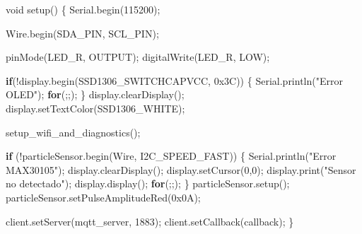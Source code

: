 \documentclass[11pt]{article}
\newenvironment{Shaded}{}{}
\newcommand{\DataTypeTok}[1]{\textcolor[rgb]{0.56,0.13,0.00}{{#1}}}
\newcommand{\DecValTok}[1]{\textcolor[rgb]{0.25,0.63,0.44}{{#1}}}
\newcommand{\BaseNTok}[1]{\textcolor[rgb]{0.25,0.63,0.44}{{#1}}}
\newcommand{\StringTok}[1]{\textcolor[rgb]{0.25,0.44,0.63}{{#1}}}
\newcommand{\NormalTok}[1]{{#1}}
\newcommand{\ControlFlowTok}[1]{\textcolor[rgb]{0.00,0.44,0.13}{\textbf{{#1}}}}
\newcommand{\OperatorTok}[1]{\textcolor[rgb]{0.40,0.40,0.40}{{#1}}}
\begin{document}
\begin{Shaded}
\begin{Highlighting}[]
\DataTypeTok{void}\NormalTok{ setup}\OperatorTok{()} \OperatorTok{\{}
\NormalTok{  Serial}\OperatorTok{.}\NormalTok{begin}\OperatorTok{(}\DecValTok{115200}\OperatorTok{);}

\NormalTok{  Wire}\OperatorTok{.}\NormalTok{begin}\OperatorTok{(}\NormalTok{SDA\_PIN}\OperatorTok{,}\NormalTok{ SCL\_PIN}\OperatorTok{);}

\NormalTok{  pinMode}\OperatorTok{(}\NormalTok{LED\_R}\OperatorTok{,}\NormalTok{ OUTPUT}\OperatorTok{);}
\NormalTok{  digitalWrite}\OperatorTok{(}\NormalTok{LED\_R}\OperatorTok{,}\NormalTok{ LOW}\OperatorTok{);}

  \ControlFlowTok{if}\OperatorTok{(!}\NormalTok{display}\OperatorTok{.}\NormalTok{begin}\OperatorTok{(}\NormalTok{SSD1306\_SWITCHCAPVCC}\OperatorTok{,} \BaseNTok{0x3C}\OperatorTok{))} \OperatorTok{\{}
\NormalTok{    Serial}\OperatorTok{.}\NormalTok{println}\OperatorTok{(}\StringTok{"Error OLED"}\OperatorTok{);}
    \ControlFlowTok{for}\OperatorTok{(;;);}
  \OperatorTok{\}}
\NormalTok{  display}\OperatorTok{.}\NormalTok{clearDisplay}\OperatorTok{();}
\NormalTok{  display}\OperatorTok{.}\NormalTok{setTextColor}\OperatorTok{(}\NormalTok{SSD1306\_WHITE}\OperatorTok{);}

\NormalTok{  setup\_wifi\_and\_diagnostics}\OperatorTok{();}

  \ControlFlowTok{if} \OperatorTok{(!}\NormalTok{particleSensor}\OperatorTok{.}\NormalTok{begin}\OperatorTok{(}\NormalTok{Wire}\OperatorTok{,}\NormalTok{ I2C\_SPEED\_FAST}\OperatorTok{))} \OperatorTok{\{}
\NormalTok{    Serial}\OperatorTok{.}\NormalTok{println}\OperatorTok{(}\StringTok{"Error MAX30105"}\OperatorTok{);}
\NormalTok{    display}\OperatorTok{.}\NormalTok{clearDisplay}\OperatorTok{();}
\NormalTok{    display}\OperatorTok{.}\NormalTok{setCursor}\OperatorTok{(}\DecValTok{0}\OperatorTok{,}\DecValTok{0}\OperatorTok{);}
\NormalTok{    display}\OperatorTok{.}\NormalTok{print}\OperatorTok{(}\StringTok{"Sensor no detectado"}\OperatorTok{);}
\NormalTok{    display}\OperatorTok{.}\NormalTok{display}\OperatorTok{();}
    \ControlFlowTok{for}\OperatorTok{(;;);}
  \OperatorTok{\}}
\NormalTok{  particleSensor}\OperatorTok{.}\NormalTok{setup}\OperatorTok{();}
\NormalTok{  particleSensor}\OperatorTok{.}\NormalTok{setPulseAmplitudeRed}\OperatorTok{(}\BaseNTok{0x0A}\OperatorTok{);}

\NormalTok{  client}\OperatorTok{.}\NormalTok{setServer}\OperatorTok{(}\NormalTok{mqtt\_server}\OperatorTok{,} \DecValTok{1883}\OperatorTok{);}
\NormalTok{  client}\OperatorTok{.}\NormalTok{setCallback}\OperatorTok{(}\NormalTok{callback}\OperatorTok{);}
\OperatorTok{\}}


\end{Highlighting}
\end{Shaded}
\end{document}
